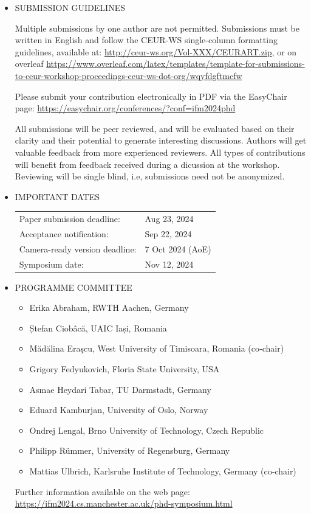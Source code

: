\documentclass[prodmode,acmtecs]{acmsmall} %
\begin{document}
\begin{itemize}
\item  SUBMISSION GUIDELINES 
 
  Multiple submissions by one author are not permitted. Submissions must be written in English and follow the CEUR-WS single-column formatting guidelines, available at: \href{http://ceur-ws.org/Vol-XXX/CEURART.zip}{http://ceur-ws.org/Vol-XXX/CEURART.zip}, or on overleaf \href{https://www.overleaf.com/latex/templates/template-for-submissions-to-ceur-workshop-proceedings-ceur-ws-dot-org/wqyfdgftmcfw}{https://www.overleaf.com/latex/templates/template-for-submissions-to-ceur-workshop-proceedings-ceur-ws-dot-org/wqyfdgftmcfw} 
 
  Please submit your contribution electronically in PDF via the EasyChair page: \href{https://easychair.org/conferences/?conf=ifm2024phd}{https://easychair.org/conferences/?conf=ifm2024phd} 
 
  All submissions will be peer reviewed, and will be evaluated based on their clarity and their potential to generate interesting discussions. Authors will get valuable feedback from more experienced reviewers. All types of contributions will benefit from feedback received during a dicussion at the workshop. Reviewing will be single blind, i.e, submissions need not be anonymized. 
 
\item  IMPORTANT DATES 
 
\begin{tabulary}{\linewidth}{LL}Paper submission deadline:  & Aug 23, 2024 \\
Acceptance notification:  & Sep 22, 2024 \\
Camera-ready version deadline:  & 7 Oct 2024 (AoE) \\
Symposium date:  & Nov 12, 2024 \\
\end{tabulary}
 
\item  PROGRAMME COMMITTEE 
 
\begin{itemize}\item  Erika Abraham, RWTH Aachen, Germany
\item  Ștefan Ciobâcă, UAIC Iași, Romania
\item  Mădălina Eraşcu, West University of Timisoara, Romania (co‑chair)
\item  Grigory Fedyukovich, Floria State University, USA
\item  Asmae Heydari Tabar, TU Darmstadt, Germany
\item  Eduard Kamburjan, University of Oslo, Norway
\item  Ondrej Lengal, Brno University of Technology, Czech Republic
\item  Philipp Rümmer, University of Regensburg, Germany
\item  Mattias Ulbrich, Karlsruhe Institute of Technology, Germany (co‑chair)
\end{itemize} 
  Further information available on the web page: \href{https://ifm2024.cs.manchester.ac.uk/phd-symposium.html}{https://ifm2024.cs.manchester.ac.uk/phd-symposium.html} 
 

\end{itemize}
\end{document}
